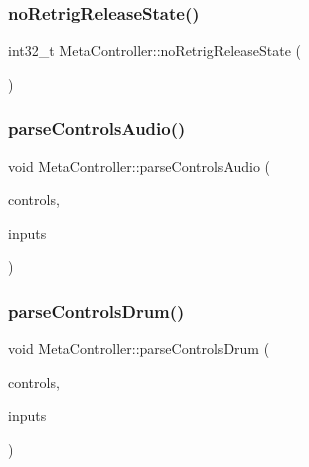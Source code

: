 \subsubsection{\texorpdfstring{no\+Retrig\+Release\+State()}{noRetrigReleaseState()}}
{\footnotesize\ttfamily int32\+\_\+t Meta\+Controller\+::no\+Retrig\+Release\+State (\begin{DoxyParamCaption}\item[{void}]{ }\end{DoxyParamCaption})}

\mbox{\label{class_meta_controller_ae12fe6794e457ed924fe53142eed83c7}} 
\subsubsection{\texorpdfstring{parse\+Controls\+Audio()}{parseControlsAudio()}}
{\footnotesize\ttfamily void Meta\+Controller\+::parse\+Controls\+Audio (\begin{DoxyParamCaption}\item[{\mbox{\hyperlink{class_via_controls}{Via\+Controls}} $\ast$}]{controls,  }\item[{\mbox{\hyperlink{class_via_input_streams}{Via\+Input\+Streams}} $\ast$}]{inputs }\end{DoxyParamCaption})}

\mbox{\label{class_meta_controller_a557b81488e8c917eaacf8ae65fd85724}} 
\subsubsection{\texorpdfstring{parse\+Controls\+Drum()}{parseControlsDrum()}}
{\footnotesize\ttfamily void Meta\+Controller\+::parse\+Controls\+Drum (\begin{DoxyParamCaption}\item[{\mbox{\hyperlink{class_via_controls}{Via\+Controls}} $\ast$}]{controls,  }\item[{\mbox{\hyperlink{class_via_input_streams}{Via\+Input\+Streams}} $\ast$}]{inputs }\end{DoxyParamCaption})}

